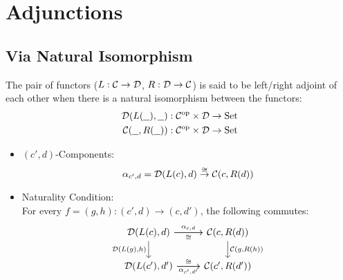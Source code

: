 \section{Adjunctions}

\subsection{Via Natural Isomorphism}

\begin{definition}
  The pair of functors ($L: \mathcal{C}\to \mathcal{D}$, $R: \mathcal{D}\to \mathcal{C}$) is said to be left/right
  adjoint of each other when there is a natural isomorphism between the
  functors:
  \parencite{leinster:basic_category_theory}
  \[
    \begin{aligned}
      \mathcal{D}(L(\underline{\ \ }), \underline{\ \ })
        &: \mathcal{C}^{\mathrm{op}} \times \mathcal{D} \to \mathrm{Set}\\
      \mathcal{C}(\underline{\ \ }, R(\underline{\ \ }))
        &: \mathcal{C}^{\mathrm{op}} \times \mathcal{D} \to \mathrm{Set}\\
    \end{aligned}
  \]

  \begin{itemize}
    \item $(c', d)$-Components:
      \[
        \alpha_{c', d}
          = \mathcal{D}(L(c), d) \overset{\cong}{\to} \mathcal{C}(c, R(d))\\
      \]
    \item Naturality Condition:\\
      For every $f = (g, h): (c', d) \to (c, d')$, the following commutes:
      \[\begin{tikzcd}[ampersand replacement=\&]
        {\D(L(c), d)} \& {\C(c, R(d))} \\
        {\D(L(c'),d')} \& {\C(c',R(d'))}
        \arrow["{\D(L(g), h)}"', from=1-1, to=2-1]
        \arrow["{\C(g, R(h))}", from=1-2, to=2-2]
        \arrow["{\alpha_{c, d}}", from=1-1, to=1-2]
        \arrow["{\alpha_{c',d'}}"', from=2-1, to=2-2]
        \arrow["\cong"', from=1-1, to=1-2]
        \arrow["\cong", from=2-1, to=2-2]
      \end{tikzcd}\]
  \end{itemize}
\end{definition}

